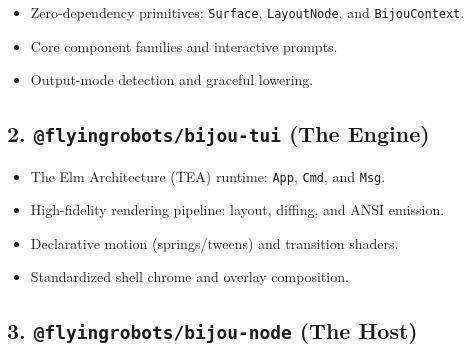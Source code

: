 \begin{itemize}
\tightlist
\item
  Zero-dependency primitives: \texttt{S\allowbreak{}u\allowbreak{}r\allowbreak{}f\allowbreak{}a\allowbreak{}c\allowbreak{}e}, \texttt{L\allowbreak{}a\allowbreak{}y\allowbreak{}o\allowbreak{}u\allowbreak{}t\allowbreak{}N\allowbreak{}o\allowbreak{}d\allowbreak{}e}, and \texttt{B\allowbreak{}i\allowbreak{}j\allowbreak{}o\allowbreak{}u\allowbreak{}C\allowbreak{}o\allowbreak{}n\allowbreak{}t\allowbreak{}e\allowbreak{}x\allowbreak{}t}.
\item
  Core component families and interactive prompts.
\item
  Output-mode detection and graceful lowering.
\end{itemize}

\subsection{\texorpdfstring{2. \texttt{@\allowbreak{}f\allowbreak{}l\allowbreak{}y\allowbreak{}i\allowbreak{}n\allowbreak{}g\allowbreak{}r\allowbreak{}o\allowbreak{}b\allowbreak{}o\allowbreak{}t\allowbreak{}s\allowbreak{}/\allowbreak{}b\allowbreak{}i\allowbreak{}j\allowbreak{}o\allowbreak{}u\allowbreak{}-\allowbreak{}t\allowbreak{}u\allowbreak{}i} (The Engine)}{2.  (The Engine)}}\label{record-003-flyingrobotsbijou-tui-the-engine}

\begin{itemize}
\tightlist
\item
  The Elm Architecture (TEA) runtime: \texttt{A\allowbreak{}p\allowbreak{}p}, \texttt{C\allowbreak{}m\allowbreak{}d}, and \texttt{M\allowbreak{}s\allowbreak{}g}.
\item
  High-fidelity rendering pipeline: layout, diffing, and ANSI emission.
\item
  Declarative motion (springs/tweens) and transition shaders.
\item
  Standardized shell chrome and overlay composition.
\end{itemize}

\subsection{\texorpdfstring{3. \texttt{@\allowbreak{}f\allowbreak{}l\allowbreak{}y\allowbreak{}i\allowbreak{}n\allowbreak{}g\allowbreak{}r\allowbreak{}o\allowbreak{}b\allowbreak{}o\allowbreak{}t\allowbreak{}s\allowbreak{}/\allowbreak{}b\allowbreak{}i\allowbreak{}j\allowbreak{}o\allowbreak{}u\allowbreak{}-\allowbreak{}n\allowbreak{}o\allowbreak{}d\allowbreak{}e} (The Host)}{3.  (The Host)}}\label{record-003-flyingrobotsbijou-node-the-host}

